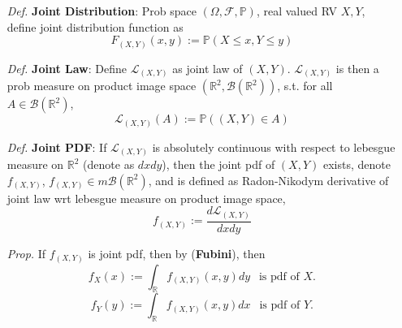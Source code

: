 \documentclass[a4paper,12pt,twoside]{book}
\begin{document}
\begin{itemize}
	\item[\textit{Def.}] \textbf{Joint Distribution}: Prob space $(\Omega, \mathcal{F}, \mathbb{P})$, real valued RV $X,Y$, define joint distribution function as
	\begin{equation}
		F_{(X,Y)}(x,y):=\mathbb{P}\left(X\leq x, Y\leq y\right)
	\end{equation}

	\item[\textit{Def.}] \textbf{Joint Law}: Define $\mathcal{L}_{(X,Y)}$ as joint law of $(X,Y)$. $\mathcal{L}_{(X,Y)}$ is then a prob measure on product image space $(\mathbb{R}^2, \mathscr{B}(\mathbb{R}^2))$, s.t. for all $A\in \mathscr{B}(\mathbb{R}^2)$,
	\begin{equation}
		\mathcal{L}_{(X,Y)}(A):=\mathbb{P}\left((X,Y)\in A\right)
	\end{equation}

	\item[\textit{Def.}] \textbf{Joint PDF}: If $\mathcal{L}_{(X,Y)}$ is absolutely continuous with respect to lebesgue measure on $\mathbb{R}^2$ (denote as $dxdy$), then the joint pdf of $(X,Y)$ exists, denote $f_{(X,Y)}$, $f_{(X,Y)}\in m\mathscr{B}(\mathbb{R}^2)$, and is defined as Radon-Nikodym derivative of joint law wrt lebesgue measure on product image space,
	\begin{equation}
		f_{(X,Y)}:= \frac{d \mathcal{L}_{(X,Y)}}{dxdy}
	\end{equation}

	\item[\textit{Prop.}] If $f_{(X,Y)}$ is joint pdf, then by (\textbf{Fubini}), then
	$$f_X(x):=\int_{\mathbb{R}}f_{(X,Y)}(x,y)dy~~\text{ is pdf of $X$.}$$
	$$f_Y(y):=\int_{\mathbb{R}}f_{(X,Y)}(x,y)dx~~\text{ is pdf of $Y$.}$$

\end{itemize}
\end{document}
